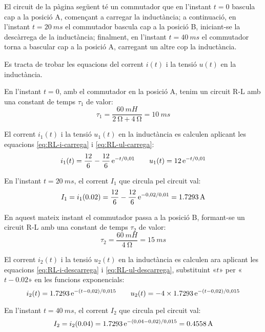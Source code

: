 \begin{exemple}\label{ex:CarDescRL}
	\addcontentsxms{\CarDescRL}	
    El circuit de la pàgina següent té un commutador que en l'instant $t=0$ bascula cap a la posició A, començant a carregar la inductància; a continuació, en l'instant $t=\qty{20}{ms}$ el commutador bascula cap a la posició B, iniciant-se la descàrrega de la inductància; finalment, en  l'instant $t=\qty{40}{ms}$ el commutador torna a  bascular cap a la posició A, carregant un altre cop la inductància.

    Es tracta de trobar les equacions del corrent $i(t)$ i la tensió $u(t)$ en la inductància.

   
    En l'instant $t=0$, amb el commutador en la posició A, tenim un circuit R-L amb una constant de temps $\tau_1$ de valor:
    \[
        \tau_1 = \frac{\qty{60}{mH}}{\qty{2}{\ohm}+\qty{4}{\ohm}} = \qty{10}{ms}
    \]


    El corrent $i_1(t)$ i la tensió $u_1(t)$ en la inductància es calculen aplicant les equacions \eqref{eq:RL-i-carrega} i \eqref{eq:RL-ul-carrega}:
    \[
        i_1(t) = \frac{12}{6} - \frac{12}{6}\,\mathrm{e}^{-t/0,01} \qquad
        u_1(t) = 12\,\mathrm{e}^{-t/0,01}
    \]

	\begin{center}
		
	\end{center}

    En l'instant $t=\qty{20}{ms}$, el corrent $I_1$ que circula pel circuit val:
    \[
        I_1 = i_1(\num{0,02}) = \frac{12}{6} - \frac{12}{6}\,\mathrm{e}^{-0,02/0,01} = \qty{1,7293}{A}
    \]

    En aquest mateix instant  el commutador passa a la posició B, formant-se un circuit R-L amb una constant de temps $\tau_2$ de valor:
    \[
        \tau_2 = \frac{\qty{60}{mH}}{\qty{4}{\ohm}} = \qty{15}{ms}
    \]

    El corrent $i_2(t)$ i la tensió $u_2(t)$ en la inductància es calculen ara aplicant les equacions \eqref{eq:RL-i-descarrega} i \eqref{eq:RL-ul-descarrega}, substituint «$t$» per «$t-\num{0,02}$» en les funcions exponencials:
    \[
        i_2(t) = \num{1,7293}\,\mathrm{e}^{-(t-0,02)/0,015} \qquad
        u_2(t) = -4\times\num{1,7293}\,\mathrm{e}^{-(t-0,02)/0,015}
    \]

    En l'instant $t=\qty{40}{ms}$, el corrent $I_2$ que circula pel circuit val:
    \[
        I_2 = i_2(\num{0,04}) = \num{1,7293}\,\mathrm{e}^{-(0,04-0,02)/0,015} = \qty{0,4558}{A}
    \]


\end{exemple}
